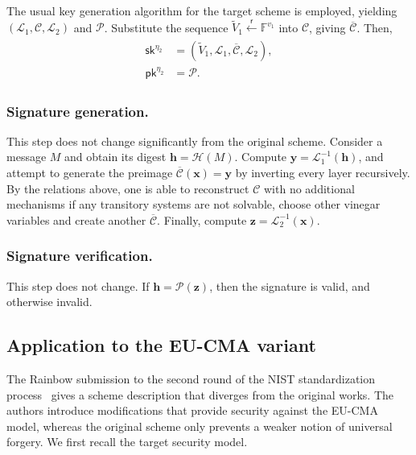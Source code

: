 \documentclass[12pt, a4paper, oneside]{memoir}
\newcommand{\random}{\overset{\mathsf{r}}{\gets}}
\theoremstyle{definition}
\begin{document}
The usual key generation algorithm for the target scheme is employed, yielding $(\mathcal{L}_{1}, \mathcal{C}, \mathcal{L}_{2})$ and $\mathcal{P}$. Substitute the sequence $\widetilde{V}_{1} \random \mathbb{F}^{v_{1}}$ into $\mathcal{C}$, giving $\overline{\mathcal{C}}$. Then, 
\begin{align}
  \begin{split}
    \mathsf{sk}^{\eta_{2}} &= (\widetilde{V}_{1}, \mathcal{L}_{1}, \overline{\mathcal{C}}, \mathcal{L}_{2}), \\
    \mathsf{pk}^{\eta_{2}} &= \mathcal{P}.
  \end{split}
\end{align}

\subsubsection{Signature generation.}

This step does not change significantly from the original scheme. Consider a message $M$ and obtain its digest $\mathbf{h} = \mathcal{H}(M)$. Compute $\mathbf{y} = \mathcal{L}_{1}^{-1}(\mathbf{h})$, and attempt to generate the preimage $\overline{\mathcal{C}}(\mathbf{x}) = \mathbf{y}$ by inverting every layer recursively. By the relations above, one is able to reconstruct $\mathcal{C}$ with no additional mechanisms if any transitory systems are not solvable, choose other vinegar variables and create another $\overline{\mathcal{C}}$. Finally, compute $\mathbf{z} = \mathcal{L}_{2}^{-1}(\mathbf{x})$.

\subsubsection{Signature verification.}

This step does not change. If $\mathbf{h} = \mathcal{P}(\mathbf{z})$, then the signature is valid, and otherwise invalid.

\subsection{Application to the EU-CMA variant}

The Rainbow submission to the second round of the NIST standardization process~\cite{Ding:201901} gives a scheme description that diverges from the original works. The authors introduce modifications that provide security against the \textsf{EU-CMA} model, whereas the original scheme only prevents a weaker notion of universal forgery. We first recall the target security model.
\end{document}
